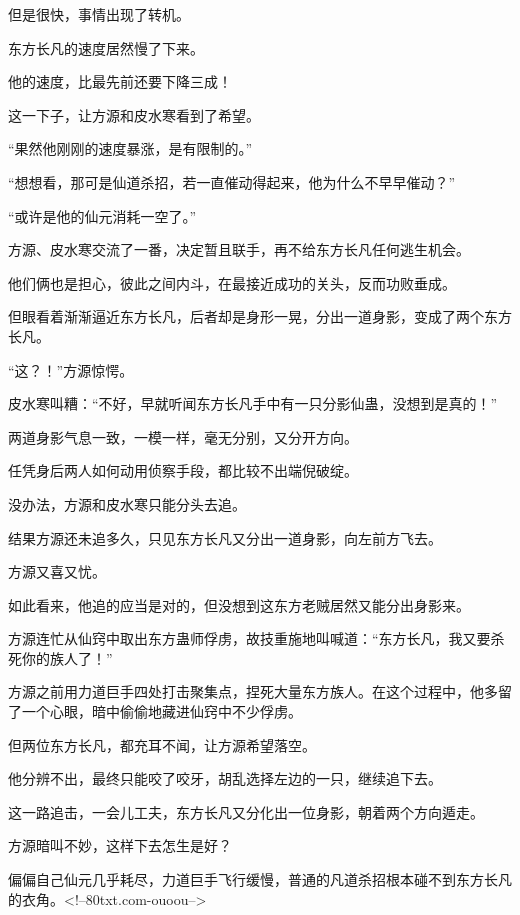 \begin{this_body}
但是很快，事情出现了转机。

东方长凡的速度居然慢了下来。

他的速度，比最先前还要下降三成！

这一下子，让方源和皮水寒看到了希望。

“果然他刚刚的速度暴涨，是有限制的。”

“想想看，那可是仙道杀招，若一直催动得起来，他为什么不早早催动？”

“或许是他的仙元消耗一空了。”

方源、皮水寒交流了一番，决定暂且联手，再不给东方长凡任何逃生机会。

他们俩也是担心，彼此之间内斗，在最接近成功的关头，反而功败垂成。

但眼看着渐渐逼近东方长凡，后者却是身形一晃，分出一道身影，变成了两个东方长凡。

“这？！”方源惊愕。

皮水寒叫糟：“不好，早就听闻东方长凡手中有一只分影仙蛊，没想到是真的！”

两道身影气息一致，一模一样，毫无分别，又分开方向。

任凭身后两人如何动用侦察手段，都比较不出端倪破绽。

没办法，方源和皮水寒只能分头去追。

结果方源还未追多久，只见东方长凡又分出一道身影，向左前方飞去。

方源又喜又忧。

如此看来，他追的应当是对的，但没想到这东方老贼居然又能分出身影来。

方源连忙从仙窍中取出东方蛊师俘虏，故技重施地叫喊道：“东方长凡，我又要杀死你的族人了！”

方源之前用力道巨手四处打击聚集点，捏死大量东方族人。在这个过程中，他多留了一个心眼，暗中偷偷地藏进仙窍中不少俘虏。

但两位东方长凡，都充耳不闻，让方源希望落空。

他分辨不出，最终只能咬了咬牙，胡乱选择左边的一只，继续追下去。

这一路追击，一会儿工夫，东方长凡又分化出一位身影，朝着两个方向遁走。

方源暗叫不妙，这样下去怎生是好？

偏偏自己仙元几乎耗尽，力道巨手飞行缓慢，普通的凡道杀招根本碰不到东方长凡的衣角。<!--80txt.com-ouoou-->

\end{this_body}

